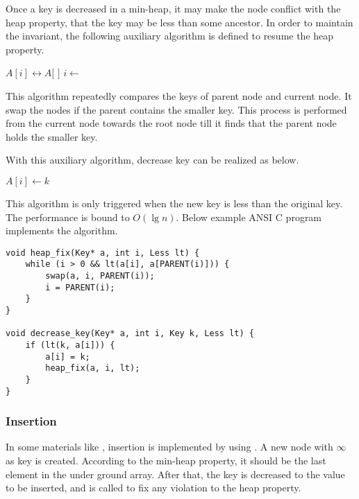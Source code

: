 \documentclass{article}
\begin{document}
Once a key is decreased in a min-heap, it may make
the node conflict with the heap property, that the key may be less
than some ancestor. In order to maintain the
invariant, the following auxiliary algorithm is defined to resume the heap
property.

\begin{algorithmic}[1]
    \State {} $A[i] \leftrightarrow A[$  $]$
    \State $i \gets$  
  \EndWhile
\EndFunction
\end{algorithmic}

This algorithm repeatedly compares the keys of parent node and
current node. It swap the nodes if
the parent contains the smaller key. This process is performed
from the current node towards the root node till it finds that
the parent node holds the smaller key.

With this auxiliary algorithm, decrease key can be realized
as below.

\begin{algorithmic}[1]
    \State $A[i] \gets k$
    \State {}
  \EndIf
\EndFunction
\end{algorithmic}

This algorithm is only triggered when the new key
is less than the original key. The performance is bound to $O(\lg n)$.
Below example ANSI C program implements the algorithm.

\lstset{language=C}
\begin{lstlisting}
void heap_fix(Key* a, int i, Less lt) {
    while (i > 0 && lt(a[i], a[PARENT(i)])) {
        swap(a, i, PARENT(i));
        i = PARENT(i);
    }
}

void decrease_key(Key* a, int i, Key k, Less lt) {
    if (lt(k, a[i])) {
        a[i] = k;
        heap_fix(a, i, lt);
    }
}
\end{lstlisting}

\subsubsection{Insertion}

In some materials like \cite{CLRS}, insertion is implemented by using .
A new node with $\infty$ as key is created. According
to the min-heap property, it should be the last element
in the under ground array. After that, the key is decreased to
the value to be inserted, and  is called
to fix any violation to the heap property.
\end{document}
